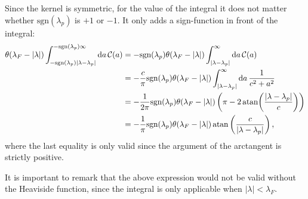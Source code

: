 \documentclass[11pt, a4paper,draft]{report} %
\newcommand{\kernel}{\mathcal{C}}
\begin{document}
Since the kernel is symmetric, for the value of the integral it does not matter whether \(\mathrm{sgn}(\lambda_p)\) is \(+1\) or \(-1\).
It only adds a sign-function in front of the integral:
\begin{align}
	\theta(\lambda_F - \lvert \lambda \rvert) \int_{-\textrm{sgn}(\lambda_p)\lvert\lambda-\lambda_p\rvert}^{ - \textrm{sgn}(\lambda_p)\infty} \dd a\,\kernel(a) &= - \textrm{sgn}(\lambda_p) \theta(\lambda_F - \lvert \lambda \rvert) \int_{\lvert\lambda-\lambda_p\rvert}^{\infty} \dd a\,\kernel(a)\\
	&= - \frac{c}{\pi} \textrm{sgn}(\lambda_p) \theta(\lambda_F - \lvert \lambda \rvert)  \int_{\lvert\lambda-\lambda_p\rvert}^{\infty} \dd a\,\frac{1}{c^2 + a^2}\\
	&= - \frac{1}{2\pi} \textrm{sgn}(\lambda_p) \theta(\lambda_F - \lvert \lambda \rvert)  \left( \pi - 2\atan(\frac{\lvert \lambda - \lambda_p\rvert}{c})\right)\label{eq:dpdeltanonsimplified}\\
	&= - \frac{1}{\pi} \textrm{sgn}(\lambda_p) \theta(\lambda_F - \lvert \lambda \rvert)  \atan\left(\frac{c}{\lvert\lambda-\lambda_p\rvert}\right),
\end{align}
where the last equality is only valid since the argument of the arctangent is strictly positive.

It is important to remark that the above expression would not be valid without the Heaviside function, since the integral is only applicable when \(\lvert\lambda\rvert< \lambda_F\).
\end{document}
